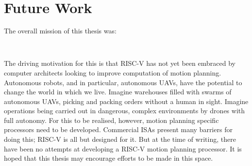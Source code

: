 \section{Future Work}
    The overall mission of this thesis was:

    \begin{center}
    \bigskip\noindent{} \\
    \end{center}
    The driving motivation for this is that RISC-V has not yet been embraced by computer architects looking to improve computation of motion planning. Autonomous robots, and in particular, autonomous \glspl{UAV}, have the potential to change the world in which we live. Imagine warehouses filled with swarms of autonomous \glspl{UAV}, picking and packing orders without a human in sight. Imagine operations being carried out in dangerous, complex environments by drones with full autonomy. For this to be realised, however, motion planning specific processors need to be developed. Commercial \glspl{ISA} present many barriers for doing this; RISC-V is all but designed for it. But at the time of writing, there have been no attempts at developing a RISC-V motion planning processor. It is hoped that this thesis may encourage efforts to be made in this space.

